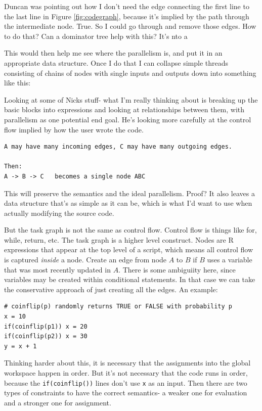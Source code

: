 \documentclass[12pt]{article}
\begin{document}
Duncan was pointing out how I don't need the edge connecting the first line
to the last line in Figure \ref{fig:codegraph}, because it's implied by the
path through the intermediate node. True. So I could go through and remove
those edges. How to do that? Can a dominator tree help with this? It's nto
a

This would then help me see where the parallelism is, and put it in an
appropriate data structure. Once I do that I can collapse simple threads
consisting of chains of nodes with single inputs and outputs
down into something like this:

Looking at some of Nicks stuff- what I'm really thinking about is breaking
up the basic blocks into expressions and looking at relationships between
them, with parallelism as one potential end goal. He's looking
more carefully at the control flow implied by how the user wrote the code.

\begin{verbatim}
A may have many incoming edges, C may have many outgoing edges.

Then:
A -> B -> C   becomes a single node ABC
\end{verbatim}

This will preserve the semantics and the ideal parallelism. Proof?
It also leaves a data structure that's as simple as it can be, which is
what I'd want to use when actually modifying the source code.

But the task graph is not the same as control flow. Control flow is things
like for, while, return, etc. The task graph is a higher level construct. 
Nodes are R expressions that appear at the top level of a script, which
means all control flow is captured \emph{inside} a node. Create an edge
from node $A$ to $B$ if $B$ uses a variable that was most recently updated
in $A$. There is some ambiguiity here, since variables may be created
within conditional statements. In that case we can take the conservative
approach of just creating all the edges. An example:

\begin{verbatim}
# coinflip(p) randomly returns TRUE or FALSE with probability p
x = 10
if(coinflip(p1)) x = 20
if(coinflip(p2)) x = 30
y = x + 1
\end{verbatim}

Thinking harder about this, it is necessary that the assignments into the
global workspace happen in order. But it's not necessary that the code runs
in order, because the \texttt{if(coinflip())} lines don't use \texttt{x} as
an input. Then there are two types of constraints to have the correct
semantics- a weaker one for evaluation and a stronger one for assignment. 
\end{document}
